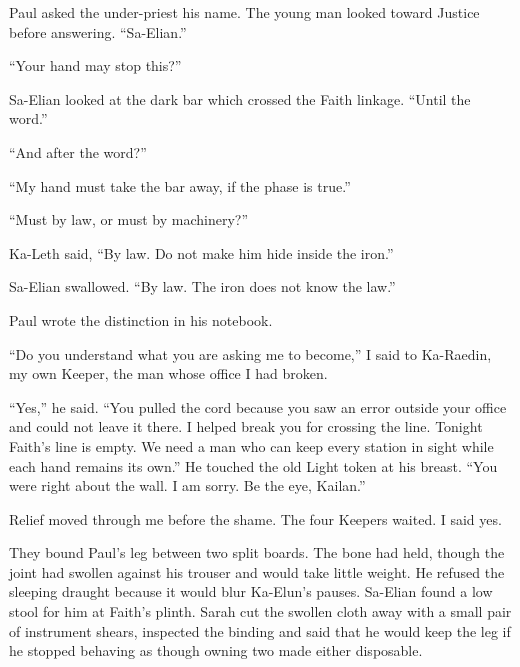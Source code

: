 Paul asked the under-priest his name. The young man looked toward Justice before answering. ``Sa-Elian.''\par

``Your hand may stop this?''\par

Sa-Elian looked at the dark bar which crossed the Faith linkage. ``Until the word.''\par

``And after the word?''\par

``My hand must take the bar away, if the phase is true.''\par

``Must by law, or must by machinery?''\par

Ka-Leth said, ``By law. Do not make him hide inside the iron.''\par

Sa-Elian swallowed. ``By law. The iron does not know the law.''\par

Paul wrote the distinction in his notebook.\par

``Do you understand what you are asking me to become,'' I said to Ka-Raedin, my own Keeper, the man whose office I had broken.\par

``Yes,'' he said. ``You pulled the cord because you saw an error outside your office and could not leave it there. I helped break you for crossing the line. Tonight Faith's line is empty. We need a man who can keep every station in sight while each hand remains its own.'' He touched the old Light token at his breast. ``You were right about the wall. I am sorry. Be the eye, Kailan.''\par

Relief moved through me before the shame. The four Keepers waited. I said yes.\par

They bound Paul's leg between two split boards. The bone had held, though the joint had swollen against his trouser and would take little weight. He refused the sleeping draught because it would blur Ka-Elun's pauses. Sa-Elian found a low stool for him at Faith's plinth. Sarah cut the swollen cloth away with a small pair of instrument shears, inspected the binding and said that he would keep the leg if he stopped behaving as though owning two made either disposable.\par

